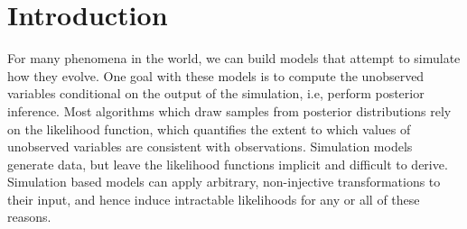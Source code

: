 
\section{Introduction}

For many phenomena in the world, we can build models that 
attempt to simulate how they evolve. One goal with 
these models is to compute the unobserved variables 
conditional on the output of the simulation, i.e, perform
posterior inference.
Most algorithms which draw samples from posterior distributions rely on
the likelihood function, which quantifies the extent to which values of 
unobserved variables are consistent with observations.
Simulation models generate data, but leave the likelihood functions implicit
and difficult to derive.
Simulation based models can apply arbitrary, non-injective transformations to their input, and hence induce intractable likelihoods for any or all of these reasons.










